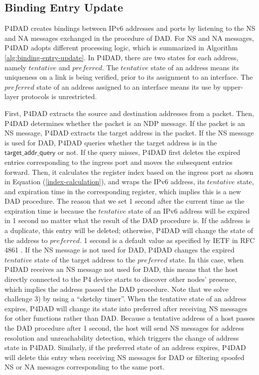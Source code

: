 \documentclass[a4paper,fleqn]{cas-dc}
\begin{document}
    \subsection{Binding Entry Update}\label{sec:binding-entry-update}
        P4DAD creates bindings between IPv6 addresses and ports by listening to the NS and NA messages exchanged in the procedure of DAD. For NS and NA messages, P4DAD adopts different processing logic, which is summarized in Algorithm \ref{alg:binding-entry-update}. In P4DAD, there are two states for each address, namely $tentative$ and $preferred$. The $tentative$ state of an address means its uniqueness on a link is being verified, prior to its assignment to an interface. The $preferred$ state of an address assigned to an interface means its use by upper-layer protocols is unrestricted.

        First, P4DAD extracts the source and destination addresses from a packet. Then, P4DAD determines whether the packet is an NDP message. If the packet is an NS message, P4DAD extracts the target address in the packet. If the NS message is used for DAD, P4DAD queries whether the target address is in the $\mathsf{target\_addr\_query}$ or not. If the query misses, P4DAD first deletes the expired entries corresponding to the ingress port and moves the subsequent entries forward. Then, it calculates the register index based on the ingress port as shown in Equation (\ref{index-calculation}), and wraps the IPv6 address, its $tentative$ state, and expiration time in the corresponding register, which implies this is a new DAD procedure. The reason that we set 1 second after the current time as the expiration time is because the $tentative$ state of an IPv6 address will be expired in 1 second no matter what the result of the DAD procedure is. If the address is a duplicate, this entry will be deleted; otherwise, P4DAD will change the state of the address to $preferred$. 1 second is a default value as specified by IETF in RFC 4861 \cite{NDP}.
        If the NS message is not used for DAD, P4DAD changes the expired $tentative$ state of the target address to the $preferred$ state. In this case, when P4DAD receives an NS message not used for DAD, this means that the host directly connected to the P4 device starts to discover other nodes' presence, which implies the address passed the DAD procedure. Note that we solve challenge 3) by using a ``sketchy timer''. When the tentative state of an address expires, P4DAD will change its state into preferred after receiving NS messages for other functions rather than DAD. Because a tentative address of a host passes the DAD procedure after 1 second, the host will send NS messages for address resolution and unreachability detection, which triggers the change of address state in P4DAD. Similarly, if the preferred state of an address expires, P4DAD will delete this entry when receiving NS messages for DAD or filtering spoofed NS or NA messages corresponding to the same port.
\end{document}
